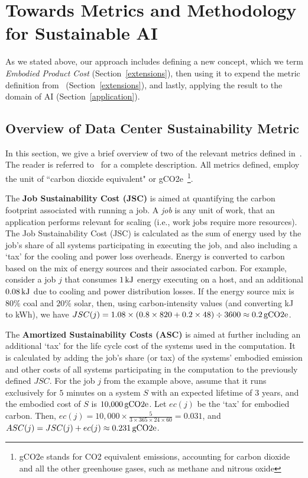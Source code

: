 \section{Towards Metrics and Methodology for Sustainable AI}
{
    \label{sec:metrics}

    As we stated above, our approach includes defining a new concept, which we term \textit{Embodied Product Cost} (Section~\ref{extensions}), then using it to expend the metric definition from~\cite{Gandhi2022} (Section~\ref{extensions}), and lastly, applying the result to the domain of AI (Section~\ref{application}).

    \subsection{Overview of Data Center Sustainability Metric}
    {
        \label{overview}

        In this section, we give a brief overview of two of the relevant metrics defined in~\cite{Gandhi2022}. The reader is referred to~\cite{Gandhi2022} for a complete description. All metrics defined, employ the unit of ``carbon dioxide equivalent" or gCO2e~\footnote{gCO2e stands for CO2 equivalent emissions, accounting for carbon dioxide and all the other greenhouse gases, such as methane and nitrous oxide}.

        The \textbf{Job Sustainability Cost (JSC)} is aimed at quantifying the carbon footprint associated with running a job. A \textit{job} is any unit of work, that an application performs relevant for scaling (i.e., work jobs require more resources). The Job Sustainability Cost (JSC) is calculated as the sum of energy used by the job's share of all systems participating in executing the job, and also including a `tax' for the cooling and power loss overheads. Energy is converted to carbon based on the mix of energy sources and their associated carbon. For example, consider a job $j$ that consumes $\unit[1]{kJ}$ energy executing on a host, and an additional $\unit[0.08]{kJ}$ due to cooling and power distribution losses. If the energy source mix is $80\%$ coal and $20\%$ solar, then, using carbon-intensity values (and converting kJ to kWh), we have $JSC \! \left ( j \right ) = 1.08 \times (0.8 \times 820 + 0.2 \times 48) \div 3600 \approx \unit[0.2]{gCO2e}$.

        The \textbf{Amortized Sustainability Costs (ASC)} is aimed at further including an additional `tax' for the life cycle cost of the systems used in the computation. It is calculated by adding the job’s share (or tax) of the systems' embodied emission and other costs of all systems participating in the computation to the previously defined $JSC$. For the job $j$ from the example above, assume that it runs exclusively for $5$ minutes on a system $S$ with an expected lifetime of $3$ years, and the embodied cost of $S$  is $\unit[10,\!000]{gCO2e}$. Let $ec \! \left ( j \right )$ be the `tax' for embodied carbon. Then, $ec \! \left ( j \right ) = 10,\!000 \times \frac{5}{3\times 365 \times 24 \times 60} = 0.031$, and $ASC \! \left ( j \right ) = JSC \! \left ( j \right ) + ec \! \left ( j \right ) \approx \unit[0.231]{gCO2e}$.

}}
